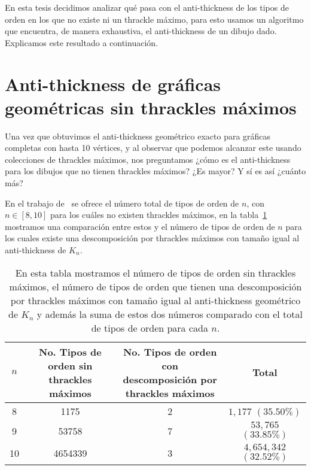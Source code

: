     En esta tesis decidimos analizar qué pasa con el anti-thickness de los tipos de orden en los que
    no existe ni un thrackle máximo, para esto usamos un algoritmo que encuentra, de manera
    exhaustiva, el anti-thickness de un dibujo dado. Explicamos este resultado a continuación.

\section{Anti-thickness de gráficas geométricas sin thrackles máximos}

  Una vez que obtuvimos el anti-thickness geométrico exacto para gráficas completas con hasta 10
  vértices, y al observar que podemos alcanzar este usando colecciones de thrackles máximos, nos
  preguntamos ¿cómo es el anti-thickness para los dibujos que no tienen thrackles máximos? ¿Es
  mayor? Y sí es así ¿cuánto más?

  En el trabajo de~\cite{Bulnes2017} se ofrece el número total de
  tipos de orden de $n$, con $n\in[8,10]$ para los cuáles no existen thrackles máximos, en la
  tabla~\ref{tabla_totales} mostramos una comparación entre estos y el número de tipos de orden de $n$ para
  los cuales existe una descomposición por thrackles máximos con tamaño igual al anti-thickness de $K_n$.

  \begin{table}
    \centering
    \begin{tabular}{|c|c|c|c|}
      \hline
      $n$     & \makecell{No. Tipos de orden sin\\ thrackles máximos} & \makecell{No. Tipos de orden con\\
      descomposición por \\ thrackles máximos} & Total \\ \hline
      8       &  1175     & 2 & $1,177$ $(35.50\%)$   \\ \hline
      9       &  53758    & 7 & \makecell{$53,765$\\$(33.85\%)$}  \\ \hline
      10      &  4654339  & 3 & \makecell{$4,654,342 $\\$(32.52\%)$}  \\ \hline
    \end{tabular}
    \caption{En esta tabla mostramos el número de tipos de orden sin thrackles máximos, el número de tipos
    de orden que tienen una descomposición por thrackles máximos con tamaño igual al anti-thickness
    geométrico de $K_n$ y además la suma de estos dos números comparado con el total de tipos de orden para
    cada $n$.}
    \label{tabla_totales}
  \end{table}

